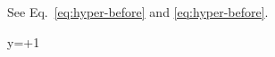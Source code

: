 \documentclass{article}
\begin{document}
See Eq.~\ref{eq:hyper-before} and \cref{eq:hyper-before}.
\begin{annotatedequation}[numbered]
y=+1\label{eq:hyper-before}
\end{annotatedequation}
\end{document}
